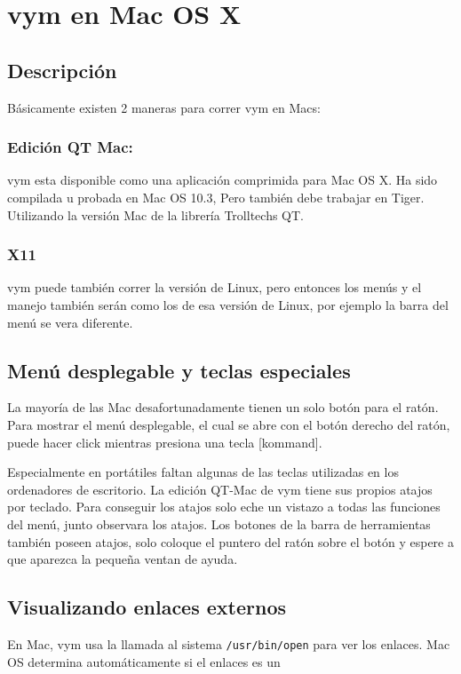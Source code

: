 \documentclass{article}
\newcommand{\vym}{{\sc vym }}
\newcommand{\key}[1]{[#1]}
\begin{document}
\section{\vym en Mac OS X}
\subsection{Descripci\'on}
B\'asicamente existen 2 maneras para correr \vym en Macs:
\subsubsection*{Edici\'on QT Mac:}
    \vym esta disponible como una aplicaci\'on comprimida para Mac OS X. Ha sido compilada u probada en Mac OS 10.3, Pero tambi\'en debe trabajar en Tiger. Utilizando la versi\'on Mac de la librer\'ia Trolltechs QT. 
\subsubsection*{X11}
    \vym puede tambi\'en correr la versi\'on de Linux, pero entonces los men\'us y el manejo tambi\'en ser\'an como los de esa versi\'on de Linux, por ejemplo la barra del men\'u se vera diferente. 

\subsection {Men\'u desplegable y teclas especiales}

La mayor\'ia de las Mac desafortunadamente tienen un solo bot\'on para el rat\'on. Para mostrar el men\'u desplegable, el cual se abre con el bot\'on derecho del rat\'on, puede hacer click mientras presiona una tecla \key{kommand}.

Especialmente en port\'atiles faltan algunas de las teclas utilizadas en los ordenadores de escritorio. La edici\'on QT-Mac de \vym tiene sus propios atajos por teclado. Para conseguir los atajos solo eche un vistazo a todas las funciones del men\'u, junto observara los atajos. Los botones de la barra de herramientas tambi\'en poseen atajos, solo coloque el puntero del rat\'on sobre el bot\'on y espere a que aparezca la peque\~na ventan de ayuda.

\subsection {Visualizando enlaces externos}

En Mac, \vym usa la llamada al sistema {\tt /usr/bin/open} para ver los enlaces. Mac OS determina autom\'aticamente si el enlaces es un 
\end{document}
